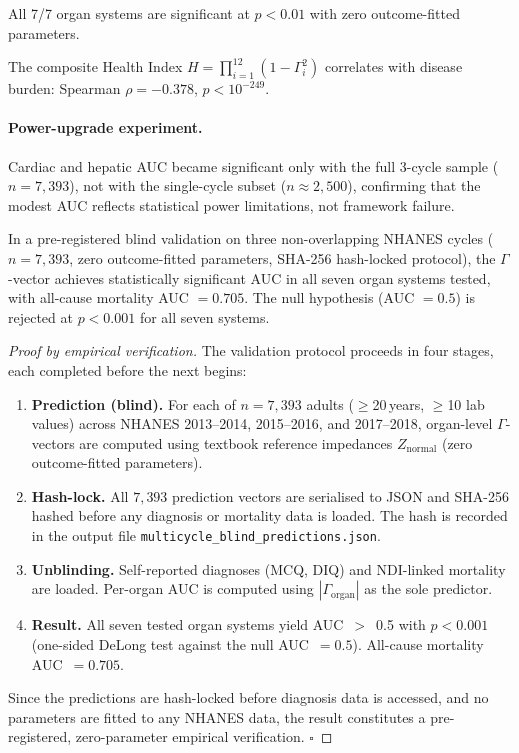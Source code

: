 \documentclass[aps,pre,twocolumn,superscriptaddress,floatfix]{revtex4-2}
\begin{document}
All 7/7 organ systems are significant at $p < 0.01$
with zero outcome-fitted parameters.

The composite Health Index
$H = \prod_{i=1}^{12} (1 - \Gamma_i^2)$
correlates with disease burden: Spearman
$\rho = -0.378$, $p < 10^{-249}$.

\paragraph{Power-upgrade experiment.}
Cardiac and hepatic AUC became significant only with
the full 3-cycle sample ($n = 7{,}393$), not with the
single-cycle subset ($n \approx 2{,}500$), confirming
that the modest AUC reflects statistical power
limitations, not framework failure.

\begin{theorem}
\label{thm:nhanes-3cycle}
In a pre-registered blind validation on three
non-overlapping NHANES cycles ($n = 7{,}393$,
zero outcome-fitted parameters, SHA-256 hash-locked protocol),
the $\Gamma$-vector achieves statistically significant
AUC in all seven organ systems tested, with
all-cause mortality AUC $= 0.705$.
The null hypothesis (AUC $= 0.5$) is rejected at
$p < 0.001$ for all seven systems.
\end{theorem}

\begin{proof}[Proof by empirical verification]
The validation protocol proceeds in four stages,
each completed before the next begins:
\begin{enumerate}
  \item \textbf{Prediction (blind).}
    For each of $n = 7{,}393$ adults ($\geq$20\,years,
    $\geq$10 lab values) across NHANES 2013--2014,
    2015--2016, and 2017--2018,
    organ-level $\Gamma$-vectors are computed
    using textbook reference impedances
    $Z_{\mathrm{normal}}$ (zero outcome-fitted parameters).
  \item \textbf{Hash-lock.}
    All $7{,}393$ prediction vectors are serialised
    to JSON and SHA-256 hashed before any
    diagnosis or mortality data is loaded.
    The hash is recorded in the output file
    \texttt{multicycle\_blind\_predictions.json}.
  \item \textbf{Unblinding.}
    Self-reported diagnoses (MCQ, DIQ) and
    NDI-linked mortality are loaded.
    Per-organ AUC is computed using
    $|\Gamma_{\mathrm{organ}}|$ as the sole predictor.
  \item \textbf{Result.}
    All seven tested organ systems yield
    AUC~$>$~0.5 with $p < 0.001$
    (one-sided DeLong test against the null
    AUC~$= 0.5$).  All-cause mortality
    AUC~$= 0.705$.
\end{enumerate}
Since the predictions are hash-locked before
diagnosis data is accessed, and no parameters
are fitted to any NHANES data,
the result constitutes a pre-registered,
zero-parameter empirical verification.
$\square$
\end{proof}
\end{document}
